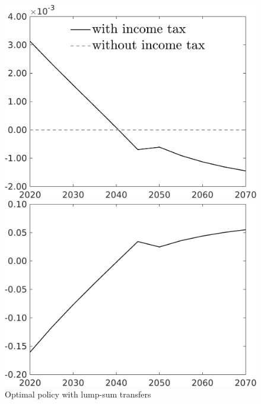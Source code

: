 \begin{figure}[h!!!]
	\centering
	\caption{Optimal policy with lump-sum transfers}\label{fig:opt_TLs}
	\begin{minipage}[]{0.32\textwidth}
		\includegraphics[width=1\textwidth]{../../codding_model/own_basedOnFried/optimalPol_010922_revision/figures/all_13Sept22_Tplus30/taul_OPT_COMPtaul_regime4_spillover0_knspil0_noskill0_sep0_xgrowth0_PV1_etaa0.79_lgd1.png}
	\end{minipage}
	\begin{minipage}[]{0.32\textwidth}
		\includegraphics[width=1\textwidth]{../../codding_model/own_basedOnFried/optimalPol_010922_revision/figures/all_13Sept22_Tplus30/tauf_OPT_COMPtaulPer_regime4_spillover0_knspil0_noskill0_sep0_xgrowth0_PV1_etaa0.79.png}

\end{minipage}
\end{figure}
